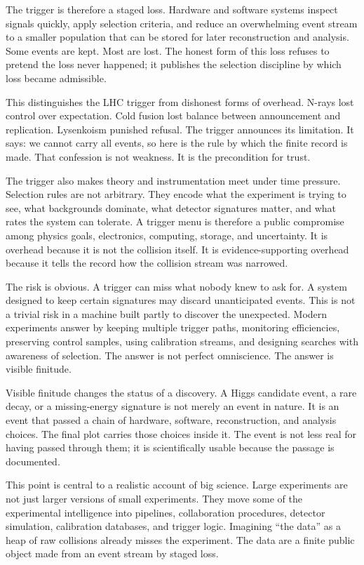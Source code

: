 The trigger is therefore a staged loss. Hardware and software systems inspect
signals quickly, apply selection criteria, and reduce an overwhelming event
stream to a smaller population that can be stored for later reconstruction and
analysis. Some events are kept. Most are lost. The honest form of this loss
refuses to pretend the loss never happened; it publishes the selection
discipline by which loss became admissible.

This distinguishes the LHC trigger from dishonest forms of overhead. N-rays
lost control over expectation. Cold fusion lost balance between announcement
and replication. Lysenkoism punished refusal. The trigger
announces its limitation. It says: we cannot carry all events, so here is the
rule by which the finite record is made. That confession is not weakness. It
is the precondition for trust.

The trigger also makes theory and instrumentation meet under time pressure.
Selection rules are not arbitrary. They encode what the experiment is trying
to see, what backgrounds dominate, what detector signatures matter, and what
rates the system can tolerate. A trigger menu is therefore a public compromise
among physics goals, electronics, computing, storage, and uncertainty. It is
overhead because it is not the collision itself. It is evidence-supporting
overhead because it tells the record how the collision stream was narrowed.

The risk is obvious. A trigger can miss what nobody knew to ask for. A system
designed to keep certain signatures may discard unanticipated events. This is
not a trivial risk in a machine built partly to discover the unexpected.
Modern experiments answer by keeping multiple trigger paths, monitoring
efficiencies, preserving control samples, using calibration streams, and
designing searches with awareness of selection. The answer is not perfect
omniscience. The answer is visible finitude.

Visible finitude changes the status of a discovery. A Higgs candidate event,
a rare decay, or a missing-energy signature is not merely an event in nature.
It is an event that passed a chain of hardware, software, reconstruction, and
analysis choices. The final plot carries those choices inside it. The event
is not less real for having passed through them; it is scientifically usable
because the passage is documented.

This point is central to a realistic account of big science. Large
experiments are not just larger versions of small experiments. They move
some of the experimental intelligence into pipelines, collaboration
procedures, detector simulation, calibration databases, and trigger logic.
Imagining ``the data'' as a heap of raw collisions already misses the
experiment. The data are a finite public object made from an event stream
by staged loss.

